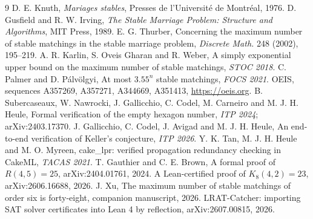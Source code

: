 \documentclass[11pt]{article}
\begin{document}
\begin{thebibliography}{9}
 D. E. Knuth, \emph{Mariages stables}, Presses de l'Universit\'e de Montr\'eal,
1976.
 D. Gusfield and R. W. Irving, \emph{The Stable Marriage Problem: Structure and
Algorithms}, MIT Press, 1989.
 E. G. Thurber, Concerning the maximum number of stable matchings in the
stable marriage problem, \emph{Discrete Math.} 248 (2002), 195--219.
 A. R. Karlin, S. Oveis Gharan and R. Weber, A simply exponential upper bound on
the maximum number of stable matchings, \emph{STOC 2018}.
 C. Palmer and D. P\'alv\"olgyi, At most $3.55^n$ stable matchings,
\emph{FOCS 2021}.
 OEIS, sequences A357269, A357271, A344669, A351413, \url{https://oeis.org}.
 B. Subercaseaux, W. Nawrocki, J. Gallicchio, C. Codel, M. Carneiro and
M. J. H. Heule, Formal verification of the empty hexagon number, \emph{ITP 2024};
arXiv:2403.17370.
 J. Gallicchio, C. Codel, J. Avigad and M. J. H. Heule, An end-to-end
verification of Keller's conjecture, \emph{ITP 2026}.
 Y. K. Tan, M. J. H. Heule and M. O. Myreen, cake\_lpr: verified propagation
redundancy checking in CakeML, \emph{TACAS 2021}.
 T. Gauthier and C. E. Brown, A formal proof of $R(4,5)=25$, arXiv:2404.01761,
2024.
 A Lean-certified proof of $K_8(4,2)=23$, arXiv:2606.16688, 2026.
 J. Xu, The maximum number of stable matchings of order six is
forty-eight, companion manuscript, 2026.
 LRAT-Catcher: importing SAT solver certificates into Lean 4 by
reflection, arXiv:2607.00815, 2026.
\end{thebibliography}
\end{document}
